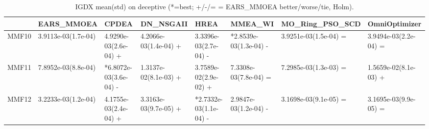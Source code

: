 \begin{table}[t]
\centering
\caption{IGDX mean(std) on deceptive (*=best; +/-/= = EARS_MMOEA better/worse/tie, Holm).}
\label{tab:deceptive_IGDX}
\begin{tabular}{llllllll}
\toprule
 & EARS\_MMOEA & CPDEA & DN\_NSGAII & HREA & MMEA\_WI & MO\_Ring\_PSO\_SCD & OmniOptimizer \\
\midrule
MMF10 & 3.9113e-03(1.7e-04) & 4.9290e-03(2.6e-04) + & 4.2066e-03(1.4e-04) + & 3.3396e-03(2.7e-04) - & *2.8539e-03(1.3e-04) - & 3.9251e-03(1.5e-04) = & 3.9494e-03(2.2e-04) = \\
MMF11 & 7.8952e-03(8.8e-04) & *6.8072e-03(3.6e-04) - & 1.3137e-02(8.1e-03) + & 3.7589e-02(2.9e-02) + & 7.3308e-03(7.8e-04) = & 7.2985e-03(1.3e-03) = & 1.5659e-02(8.1e-03) + \\
MMF12 & 3.2233e-03(1.2e-04) & 4.1755e-03(2.4e-04) + & 3.3163e-03(9.7e-05) + & *2.7332e-03(1.1e-04) - & 2.9847e-03(1.2e-04) - & 3.1698e-03(9.1e-05) = & 3.1695e-03(9.9e-05) = \\
\bottomrule
\end{tabular}
\end{table}
